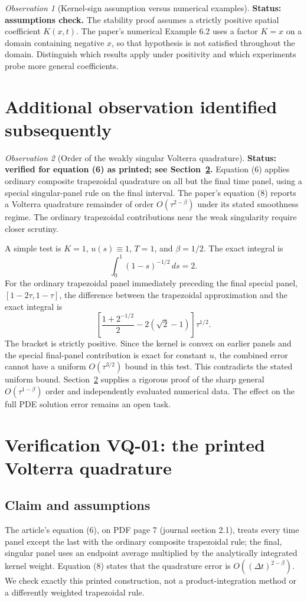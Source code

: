 \documentclass[11pt]{amsart}
\numberwithin{equation}{section}
\theoremstyle{remark}
\newtheorem{observation}{Observation}
\begin{document}
\begin{observation}[Kernel-sign assumption versus numerical examples]
\textbf{Status: assumptions check.}
The stability proof assumes a strictly positive spatial coefficient
$K(x,t)$. The paper's numerical Example 6.2 uses a factor
$K=x$ on a domain containing negative $x$, so that hypothesis is
not satisfied throughout the domain. Distinguish which results apply under
positivity and which experiments probe more general coefficients.
\end{observation}

\section{Additional observation identified subsequently}
\begin{observation}[Order of the weakly singular Volterra quadrature]
\textbf{Status: verified for equation (6) as printed; see
Section~\ref{sec:vq}.}
Equation (6) applies ordinary composite trapezoidal quadrature on all but the
final time panel, using a special singular-panel rule on the final interval.
The paper's equation (8) reports a Volterra quadrature remainder of order
$O(\tau^{2-\beta})$ under its stated smoothness regime. The ordinary
trapezoidal contributions near the weak singularity require closer scrutiny.

A simple test is $K=1$, $u(s)\equiv1$, $T=1$, and $\beta=1/2$.
The exact integral is
\[
\int_0^1(1-s)^{-1/2}\,ds=2.
\]
For the ordinary trapezoidal panel immediately preceding the final special
panel, $[1-2\tau,1-\tau]$, the difference between the trapezoidal
approximation and the exact integral is
\[
\left[\frac{1+2^{-1/2}}2-2(\sqrt2-1)\right]\tau^{1/2}.
\]
The bracket is strictly positive. Since the kernel is convex on earlier
panels and the special final-panel contribution is exact for constant $u$,
the combined error cannot have a uniform $O(\tau^{3/2})$ bound in this test.
This contradicts the stated uniform bound. Section~\ref{sec:vq} supplies a
rigorous proof of the sharp general $O(\tau^{1-\beta})$ order and
independently evaluated numerical data. The effect on the full PDE solution
error remains an open task.
\end{observation}

\section{Verification VQ-01: the printed Volterra quadrature}\label{sec:vq}
\subsection{Claim and assumptions}
The article's equation (6), on PDF page 7 (journal section 2.1), treats every
time panel except the last with the ordinary composite trapezoidal rule; the
final, singular panel uses an endpoint average multiplied by the analytically
integrated kernel weight. Equation (8) states that the quadrature error is
$O((\Delta t)^{2-\beta})$. We check exactly this printed construction, not a
product-integration method or a differently weighted trapezoidal rule.
\end{document}
